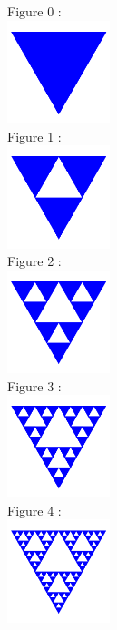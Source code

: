 \documentclass[a4paper,11pt,exos]{nsi} %
\begin{document}
\begin{multicols}{5}
    Figure 0 :\\
    \includegraphics[width=3cm]{Sierpinsky0.png}\\
    \vfill\null
    \columnbreak
    Figure 1 :\\
    \includegraphics[width=3cm]{Sierpinsky1.png}\\
    \vfill\null
    \columnbreak
    Figure 2 :\\
    \includegraphics[width=3cm]{Sierpinsky2.png}\\
    \vfill\null
    \columnbreak
    Figure 3 :\\
    \includegraphics[width=3cm]{Sierpinsky3.png}\\
    \vfill\null
    \columnbreak
    Figure 4 :\\
    \includegraphics[width=3cm]{Sierpinsky4.png}
\end{multicols}
\end{document}
